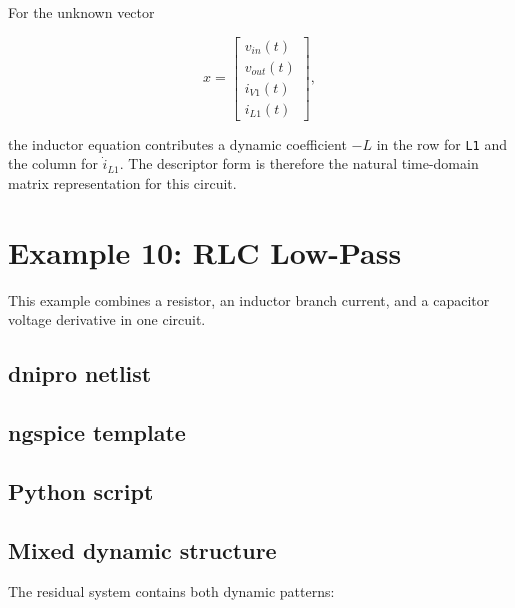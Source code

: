 \documentclass[11pt,a4paper]{article}
\newcommand{\code}[1]{\texttt{#1}}
\begin{document}
For the unknown vector

\begin{equation}
    x =
    \begin{bmatrix}
        v_{in}(t) \\
        v_{out}(t) \\
        i_{V1}(t) \\
        i_{L1}(t)
    \end{bmatrix},
\end{equation}

the inductor equation contributes a dynamic coefficient \(-L\) in the row for
\code{L1} and the column for \(\dot{i}_{L1}\). The descriptor form is therefore
the natural time-domain matrix representation for this circuit.

\section{Example 10: RLC Low-Pass}
\label{sec:ex-rlc-lowpass}

This example combines a resistor, an inductor branch current, and a capacitor
voltage derivative in one circuit.

\subsection{dnipro netlist}



\subsection{ngspice template}



\subsection{Python script}



\subsection{Mixed dynamic structure}

The residual system contains both dynamic patterns:
\end{document}
